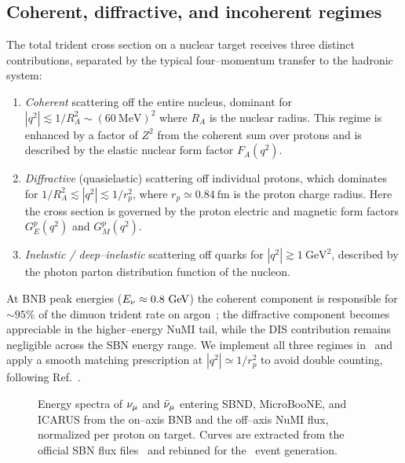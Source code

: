 \subsection{Coherent, diffractive, and incoherent regimes}

The total trident cross section on a nuclear target receives three
distinct contributions, separated by the typical four--momentum transfer
to the hadronic system:
\begin{enumerate}
\item \emph{Coherent} scattering off the entire nucleus, dominant for
$|q^2| \lesssim 1/R_A^2 \sim (60~\text{MeV})^2$ where $R_A$ is the nuclear
radius.  This regime is enhanced by a factor of $Z^2$ from the coherent
sum over protons and is described by the elastic nuclear form factor
$F_A(q^2)$.
\item \emph{Diffractive} (quasielastic) scattering off individual
protons, which dominates for $1/R_A^2 \lesssim |q^2| \lesssim 1/r_p^2$,
where $r_p \simeq 0.84~\text{fm}$ is the proton charge radius.  Here
the cross section is governed by the proton electric and magnetic
form factors $G_E^p(q^2)$ and $G_M^p(q^2)$.
\item \emph{Inelastic / deep--inelastic} scattering off quarks for
$|q^2| \gtrsim 1~\text{GeV}^2$, described by the photon parton
distribution function of the nucleon.
\end{enumerate}
At BNB peak energies ($E_\nu \approx 0.8~\text{GeV}$) the coherent
component is responsible for $\sim 95\%$ of the dimuon trident rate on
argon~\cite{Ballett:2018uuc,Zhou:2019vxt}; the diffractive component
becomes appreciable in the higher--energy NuMI tail, while the DIS
contribution remains negligible across the SBN energy range.  We
implement all three regimes in \Neptune\ and apply a smooth matching
prescription at $|q^2| \simeq 1/r_p^2$ to avoid double counting,
following Ref.~\cite{Zhou:2019vxt}.

\begin{figure}[t]
  \centering
  \caption{Energy spectra of $\nu_\mu$ and $\bar{\nu}_\mu$ entering SBND,
    MicroBooNE, and ICARUS from the on--axis BNB and the off--axis NuMI
    flux, normalized per proton on target.  Curves are extracted from
    the official SBN flux files~\cite{SBN-proposal} and rebinned for the
    \Neptune\ event generation.}
  \label{fig:fluxes}
\end{figure}


